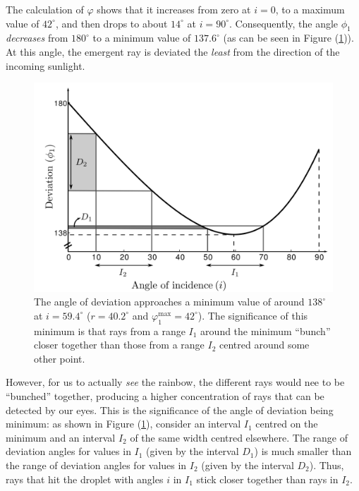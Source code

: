 \begin{refsection}
The calculation of $\varphi$ shows that it increases from zero at $i=0$, to a maximum value of $42^\circ$, and then drops to about $14^\circ$ at $i=90^\circ$. Consequently, the angle $\phi_1$ \textit{decreases} from $180^\circ$ to a minimum value of $137.6^\circ$ (as can be seen in Figure (\ref{fig:minDevGraph})). At this angle, the emergent ray is deviated the \textit{least} from the direction of the incoming sunlight.

\begin{figure}[!htb]
    \centering
    \includegraphics[scale=0.5]{figs/minimumDevGraph.png}
    \caption{The angle of deviation approaches a minimum value of around $138^\circ$ at $i=59.4^\circ$ ($r=40.2^\circ$ and $\varphi_1^\text{max} = 42^\circ$). The significance of this minimum is that rays from a range $I_1$ around the minimum ``bunch'' closer together than those from a range $I_2$ centred around some other point.}
    \label{fig:minDevGraph}
\end{figure}

However, for us to actually \textit{see} the rainbow, the different rays would nee to be ``bunched'' together, producing a higher concentration of rays that can be detected by our eyes. This is the significance of the angle of deviation being minimum: as shown in Figure (\ref{fig:minDevGraph}), consider an interval $I_1$ centred on the minimum and an interval $I_2$ of the same width centred elsewhere. The range of deviation angles for values in $I_1$ (given by the interval $D_1$) is much smaller than the range of deviation angles for values in $I_2$ (given by the interval $D_2$). Thus, rays that hit the droplet with angles $i$ in $I_1$ stick closer together than rays in $I_2$.


\end{refsection}
